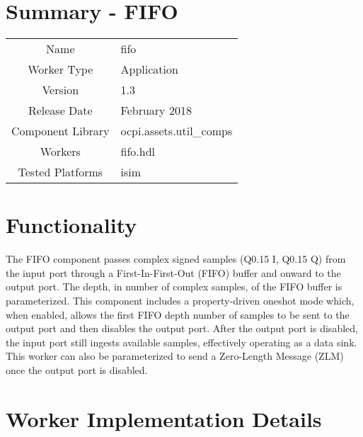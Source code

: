 \documentclass{article}
\author{} %
\date{Version \docVersion} %
\title{\docTitle}
\def\docVersion{1.3}
\def\comp{fifo}
\def\Comp{FIFO}
\begin{document}
\section*{Summary - \Comp}
\begin{tabular}{|c|M{13.5cm}|}
  \hline
                    &                                                              \\
  \hline
  Name              & \comp                                                        \\
  \hline
  Worker Type       & Application                                                  \\
  \hline
  Version           & \docVersion                                                 \\
  \hline
  Release Date      & February 2018                                               \\
  \hline
  Component Library & ocpi.assets.util\_comps                                        \\
  \hline
  Workers           & \comp.hdl                                                    \\
  \hline
  Tested Platforms  & isim \\
  \hline
\end{tabular}

\section*{Functionality}
\begin{flushleft}
  The FIFO component passes complex signed samples (Q0.15 I, Q0.15 Q) from the input port through a First-In-First-Out (FIFO) buffer and onward to the output port. The depth, in number of complex samples, of the FIFO buffer is parameterized. This component includes a property-driven oneshot mode which, when enabled, allows the first FIFO depth number of samples to be sent to the output port and then disables the output port. After the output port is disabled, the input port still ingests available samples, effectively operating as a data sink. This worker can also be parameterized to send a Zero-Length Message (ZLM) once the output port is disabled.
\end{flushleft}

\section*{Worker Implementation Details}
\end{document}
